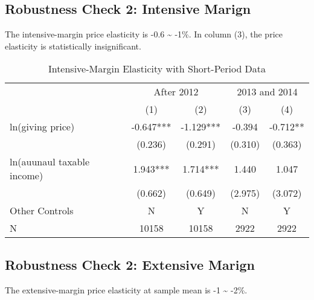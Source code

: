 \documentclass[ review  , 3p ]{elsarticle}
\begin{document}
  \hypertarget{robustness-check-2-intensive-marign}{%
  \subsection{Robustness Check 2: Intensive Marign}\label{robustness-check-2-intensive-marign}}

  The intensive-margin price elasticity is -0.6 \textasciitilde{} -1\%.
  In column (3), the price elasticity is statistically insignificant.

  \begin{table}

  \caption{\label{tab:kableShortElasticity2Slide1}Intensive-Margin Elasticity with Short-Period Data}
  \centering
  \fontsize{8}{10}\selectfont
  \begin{tabular}[t]{lcccc}
  \toprule
  \multicolumn{1}{c}{ } & \multicolumn{2}{c}{After 2012} & \multicolumn{2}{c}{2013 and 2014} \\
  \cmidrule(l{3pt}r{3pt}){2-3} \cmidrule(l{3pt}r{3pt}){4-5}
   & (1) & (2) & (3) & (4)\\
  \midrule
  ln(giving price) & -0.647*** & -1.129*** & -0.394 & -0.712**\\
   & (0.236) & (0.291) & (0.310) & (0.363)\\
  ln(auunaul taxable income) & 1.943*** & 1.714*** & 1.440 & 1.047\\
   & (0.662) & (0.649) & (2.975) & (3.072)\\
  Other Controls & N & Y & N & Y\\
  N & 10158 & 10158 & 2922 & 2922\\
  \bottomrule
  \end{tabular}
  \end{table}

  \hypertarget{robustness-check-2-extensive-marign}{%
  \subsection{Robustness Check 2: Extensive Marign}\label{robustness-check-2-extensive-marign}}

  The extensive-margin price elasticity at sample mean is -1 \textasciitilde{} -2\%.
\end{document}
